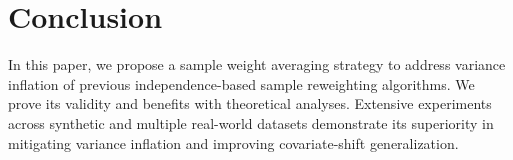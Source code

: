 \section{Conclusion}

In this paper, we propose a sample weight averaging strategy to address variance inflation of previous independence-based sample reweighting algorithms. 
We prove its validity and benefits with theoretical analyses. 
Extensive experiments across synthetic and multiple real-world datasets demonstrate its superiority in mitigating variance inflation and improving covariate-shift generalization.  
